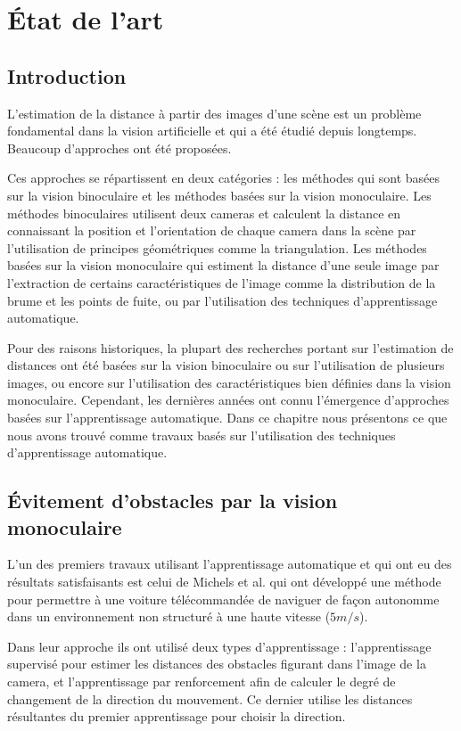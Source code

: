 \chapter{\'Etat de l'art}

\section{Introduction}

L'estimation de la distance à partir des images d'une scène est un problème
fondamental dans la vision artificielle et qui a été étudié depuis longtemps.
Beaucoup d'approches ont été proposées.

Ces approches se répartissent en deux catégories : les méthodes qui sont basées
sur la vision binoculaire et les méthodes basées sur la vision monoculaire.
Les méthodes binoculaires utilisent deux cameras et calculent la distance
en connaissant la position et l'orientation de chaque camera dans la scène
par l'utilisation de principes géométriques comme la triangulation. Les
méthodes basées sur la vision monoculaire qui estiment la distance d'une seule
image par l'extraction de certains caractéristiques de l'image comme la
distribution de la brume et les points de fuite, ou par l'utilisation des
techniques d'apprentissage automatique.

Pour des raisons historiques, la plupart des recherches portant sur l'estimation
de distances ont été basées sur la vision binoculaire ou sur l'utilisation de
plusieurs images, ou encore sur l'utilisation des caractéristiques bien définies
dans la vision monoculaire. Cependant, les dernières années ont connu
l'émergence d'approches basées sur l'apprentissage automatique.
Dans ce chapitre nous présentons ce que nous avons trouvé comme travaux basés
sur l'utilisation des techniques d'apprentissage automatique.

\section{\'Evitement d'obstacles par la vision monoculaire}

L'un des premiers travaux utilisant l'apprentissage automatique et qui ont eu
des résultats satisfaisants est celui de Michels et al.\cite{michels2005high}
qui ont développé une méthode pour permettre à une voiture télécommandée de
naviguer de façon autonomme dans un environnement non structuré à une haute
vitesse ($5m/s$).

Dans leur approche ils ont utilisé deux types d'apprentissage : l'apprentissage
supervisé pour estimer les distances des obstacles figurant dans l'image de la
camera, et l'apprentissage par renforcement afin de calculer le degré de
changement de la direction du mouvement. Ce dernier utilise les distances résultantes
du premier apprentissage pour choisir la direction.

